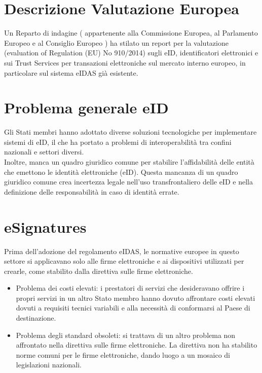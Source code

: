 \section{Descrizione Valutazione Europea}
Un Reparto di indagine ( appartenente alla Commissione Europea, al Parlamento Europeo e al Consiglio Europeo ) ha stilato un report per la valutazione (evaluation of Regulation (EU) No 910/2014) sugli eID, identificatori elettronici e sui Trust Services per transazioni elettroniche sul mercato interno europeo, in particolare sul sistema eIDAS già esistente.
\section{Problema generale eID}
Gli Stati membri hanno adottato diverse soluzioni tecnologiche per implementare sistemi di eID, il che ha portato a problemi di interoperabilità tra confini nazionali e settori diversi.\\
Inoltre, manca un quadro giuridico comune per stabilire l'affidabilità delle entità che emettono le identità elettroniche (eID). Questa mancanza di un quadro giuridico comune crea incertezza legale nell'uso transfrontaliero delle eID e nella definizione delle responsabilità in caso di identità errate.

\section{eSignatures}
Prima dell'adozione del regolamento eIDAS, le normative europee in questo settore si applicavano solo alle firme elettroniche e ai dispositivi utilizzati per crearle, come stabilito dalla direttiva sulle firme elettroniche.
\begin{itemize}
    \item Problema dei costi elevati: i prestatori di servizi che desideravano offrire i propri servizi in un altro Stato membro hanno dovuto affrontare costi elevati dovuti a requisiti tecnici variabili e alla necessità di conformarsi al Paese di destinazione.
    \item Problema degli standard obsoleti: si trattava di un altro problema non affrontato nella direttiva sulle firme elettroniche. La direttiva non ha stabilito norme comuni per le firme elettroniche, dando luogo a un mosaico di legislazioni nazionali.
    
\end{itemize}


